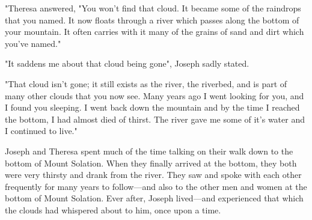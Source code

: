 "Theresa answered, "You won't find that cloud. It became some of the raindrops that you named. It now floats through a river which passes along the bottom of your mountain. It often carries with it many of the grains of sand and dirt which you've named."

"It saddens me about that cloud being gone", Joseph sadly stated.

"That cloud isn't gone; it still exists as the river, the riverbed, and is part of many other clouds that you now see. Many years ago I went looking for you, and I found you sleeping. I went back down the mountain and by the time I reached the bottom, I had almost died of thirst. The river gave me some of it's water and I continued to live."

Joseph and Theresa spent much of the time talking on their walk down to the bottom of Mount Solation. When they finally arrived at the bottom, they both were very thirsty and drank from the river. They saw and spoke with each other frequently for many years to follow—and also to the other men and women at the bottom of Mount Solation. Ever after, Joseph lived—and experienced that which the clouds had whispered about to him, once upon a time.